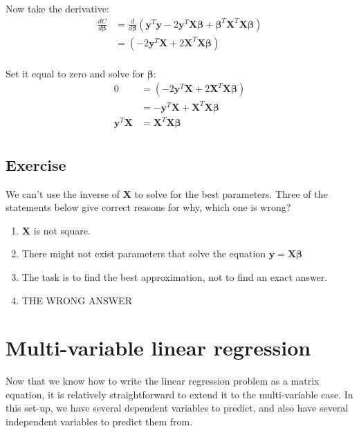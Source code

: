 \documentclass[11pt]{article}
\newcommand\xmtx{\boldsymbol{X}}
\newcommand\betavec{\boldsymbol{\beta}}
\newcommand\yvec{\boldsymbol{y}}
\begin{document}
Now take the derivative:
\begin{equation}
    \begin{aligned}
        \frac{dC}{d\betavec} &= \frac{d}{d\betavec} 
            (\yvec^T \yvec  - 2 \yvec^T \xmtx \betavec + \betavec^T \xmtx^T \xmtx \betavec )\\
            &= (- 2 \yvec^T \xmtx + 2 \xmtx^T \xmtx \betavec )\\
    \end{aligned}
\end{equation}

Set it equal to zero and solve for $\betavec$:
\begin{equation}
    \begin{aligned}
        0 &= (- 2 \yvec^T \xmtx + 2 \xmtx^T \xmtx \betavec ) \\
          &= -\yvec^T \xmtx + \xmtx^T \xmtx \betavec \\
         \yvec^T \xmtx &=  \xmtx^T \xmtx \betavec \\
    \end{aligned}
\end{equation}



\subsection{ Exercise }

We can't use the inverse of $\xmtx$ to solve for the best parameters.
Three of the statements below give correct reasons for why, which one is
wrong?

\begin{enumerate}
    \item $\xmtx$ is not square.
    \item There might not exist parameters that solve the equation
        $\yvec = \xmtx \betavec$
    \item The task is to find the best approximation, not to find an
        exact answer.
    \item THE WRONG ANSWER
\end{enumerate}

\section{ Multi-variable linear regression }

Now that we know how to write the linear regression problem as a matrix
equation, it is relatively straightforward to extend it to the
multi-variable case. In this set-up, we have several dependent variables to
predict, and also have several independent variables to predict them
from.
\end{document}
